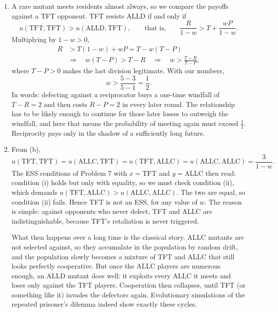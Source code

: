 \documentclass[a4paper,12pt]{article}
\begin{document}
\begin{enumerate}[label=(\alph*)]
\item A rare mutant meets residents almost always, so we compare the payoffs against a TFT opponent. TFT resists ALLD if and only if
\[ u(\text{TFT},\text{TFT}) > u(\text{ALLD},\text{TFT}),
\qquad\text{that is,}\qquad
\frac{R}{1-w} > T + \frac{wP}{1-w} . \]
Multiplying by $1-w>0$,
\[ \begin{aligned}
R &> T(1-w)+wP = T - w\left( T-P \right)\\
&\Longrightarrow\quad w\left( T-P \right) > T-R
\quad\Longrightarrow\quad
w > \frac{T-R}{T-P} ,
\end{aligned} \]
where $T-P>0$ makes the last division legitimate. With our numbers,
\[ w > \frac{5-3}{5-1} = \frac{1}{2} . \]
In words: defecting against a reciprocator buys a one-time windfall of $T-R=2$ and then costs $R-P=2$ in every later round. The relationship has to be likely enough to continue for those later losses to outweigh the windfall, and here that means the probability of meeting again must exceed $\frac{1}{2}$. Reciprocity pays only in the shadow of a sufficiently long future.

\item From (b),
\[ u(\text{TFT},\text{TFT}) = u(\text{ALLC},\text{TFT})
= u(\text{TFT},\text{ALLC}) = u(\text{ALLC},\text{ALLC}) = \frac{3}{1-w} . \]
The ESS conditions of Problem 7 with $x=\text{TFT}$ and $y=\text{ALLC}$ then read: condition (i) holds but only with equality, so we must check condition (ii), which demands $u(\text{TFT},\text{ALLC})>u(\text{ALLC},\text{ALLC})$. The two are equal, so condition (ii) fails. Hence TFT is not an ESS, for any value of $w$. The reason is simple: against opponents who never defect, TFT and ALLC are indistinguishable, because TFT's retaliation is never triggered.

What then happens over a long time is the classical story. ALLC mutants are not selected against, so they accumulate in the population by random drift, and the population slowly becomes a mixture of TFT and ALLC that still looks perfectly cooperative. But once the ALLC players are numerous enough, an ALLD mutant does well: it exploits every ALLC it meets and loses only against the TFT players. Cooperation then collapses, until TFT (or something like it) invades the defectors again. Evolutionary simulations of the repeated prisoner's dilemma indeed show exactly these cycles.

\end{enumerate}
\end{document}
